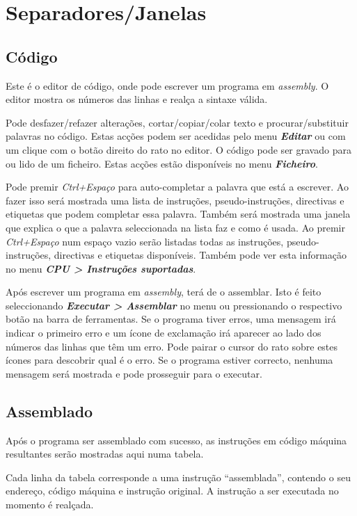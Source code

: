 \documentclass[11pt,a4paper,twoside,titlepage]{article}
\newcommand{\menupath}[1]{\textbf{\emph{#1}}}
\begin{document}
\section{Separadores/Janelas}

\subsection{Código}

Este é o editor de código, onde pode escrever um programa em \emph{assembly}.
O editor mostra os números das linhas e realça a sintaxe válida.

Pode desfazer/refazer alterações, cortar/copiar/colar texto e 
procurar/substituir palavras no código. Estas acções podem ser acedidas pelo
menu \menupath{Editar} ou com um clique com o botão direito do rato no editor.
O código pode ser gravado para ou lido de um ficheiro. Estas acções estão
disponíveis no menu \menupath{Ficheiro}.

Pode premir \emph{Ctrl+Espaço} para auto-completar a palavra que está a escrever.
Ao fazer isso será mostrada uma lista de instruções, pseudo-instruções,
directivas e etiquetas que podem completar essa palavra.
Também será mostrada uma janela que explica o que a palavra seleccionada na lista
faz e como é usada.
Ao premir \emph{Ctrl+Espaço} num espaço vazio serão listadas todas as instruções,
pseudo-instruções, directivas e etiquetas disponíveis.
Também pode ver esta informação no menu \menupath{CPU > Instruções suportadas}.

Após escrever um programa em \emph{assembly}, terá de o assemblar.
Isto é feito seleccionando \menupath{Executar > Assemblar} no menu ou pressionando
o respectivo botão na barra de ferramentas.
Se o programa tiver erros, uma mensagem irá indicar o primeiro erro e um ícone de
exclamação irá aparecer ao lado dos números das linhas que têm um erro.
Pode pairar o cursor do rato sobre estes ícones para descobrir qual é o erro.
Se o programa estiver correcto, nenhuma mensagem será mostrada e pode prosseguir
para o executar.


\subsection{Assemblado} \label{sec:assembled}

Após o programa ser assemblado com sucesso, as instruções em código máquina
resultantes serão mostradas aqui numa tabela.

Cada linha da tabela corresponde a uma instrução ``assemblada'', contendo o seu
endereço, código máquina e instrução original.
A instrução a ser executada no momento é realçada.
\end{document}
